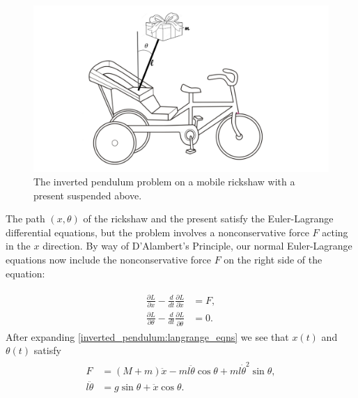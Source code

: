 \begin{figure}
\centering
\includegraphics[width=\textwidth]{figures/rickshaw_img.png}
\caption{The inverted pendulum problem on a mobile rickshaw with a present suspended above.
}
\label{fig:inverted_pendulum:rickshaw_diagram}
\end{figure}

The path $(x,\theta)$ of the rickshaw and the present satisfy the Euler-Lagrange differential equations, but the problem involves a nonconservative force $F$ acting in the $x$ direction.
By way of D'Alambert's Principle, our normal Euler-Lagrange equations now include the nonconservative force $F$ on the right side of the equation:

\begin{align}
	\begin{split}
\frac{\partial L}{\partial x} - \frac{d}{dt} \frac{\partial L}{\partial \dot{x}} &= F,\\
\frac{\partial L}{\partial \theta} - \frac{d}{dt} \frac{\partial L}{\partial \dot{\theta}} &= 0.
	\end{split}\label{inverted_pendulum:langrange_eqns}
\end{align}
After expanding \eqref{inverted_pendulum:langrange_eqns} we see that $x(t)$ and $\theta(t)$ satisfy
\begin{align}
	\begin{split}
		F &= (M + m)\ddot{x} - ml\ddot{\theta} \cos \theta + ml \dot{\theta}^2 \sin \theta,\\
		l \ddot{\theta} &= g \sin \theta + \ddot{x} \cos \theta.
	\end{split}\label{inverted_pendulum:langrange_eqns_explicit}
\end{align}

